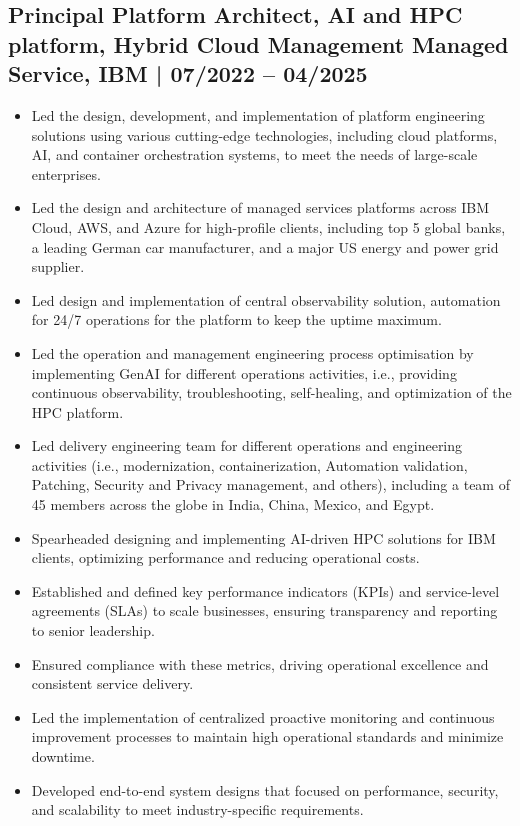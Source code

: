 \documentclass[12pt,parskip=half]{scrartcl}
\begin{document}
\subsection*{Principal Platform Architect, AI and HPC platform, Hybrid Cloud Management Managed Service, IBM | 07/2022 -- 04/2025}
\begin{itemize}
   \item Led the design, development, and implementation of platform engineering solutions using various cutting-edge technologies, including cloud platforms, AI, and container orchestration systems, to meet the needs of large-scale enterprises.
   \item Led the design and architecture of managed services platforms across IBM Cloud, AWS, and Azure for high-profile clients, including top 5 global banks, a leading German car manufacturer, and a major US energy and power grid supplier.
    \item Led design and implementation of central observability solution, automation for 24/7 operations for the platform to keep the uptime maximum.
    \item Led the operation and management engineering process optimisation by implementing GenAI for different operations activities, i.e., providing continuous observability, troubleshooting, self-healing, and optimization of the HPC platform. 
    \item Led delivery engineering team for different operations and engineering activities (i.e., modernization, containerization, Automation validation, Patching, Security and Privacy management, and others), including a team of 45 members across the globe in India, China, Mexico, and Egypt. 
    \item Spearheaded designing and implementing AI-driven HPC solutions for IBM clients, optimizing performance and reducing operational costs.
    
    \item Established and defined key performance indicators (KPIs) and service-level agreements (SLAs) to scale businesses, ensuring transparency and reporting to senior leadership.
\item Ensured compliance with these metrics, driving operational excellence and consistent service delivery.
\item Led the implementation of centralized proactive monitoring and continuous improvement processes to maintain high operational standards and minimize downtime.
\item Developed end-to-end system designs that focused on performance, security, and scalability to meet industry-specific requirements.


\end{itemize}
\end{document}
